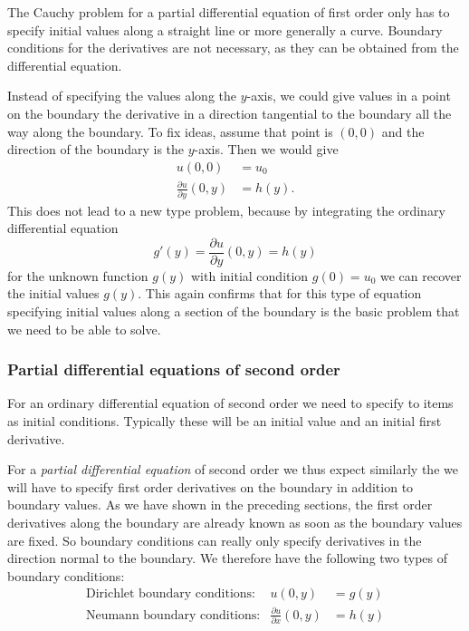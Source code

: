 The Cauchy problem for a partial differential equation of first order
only has to specify initial values along a straight line or more generally
a curve.
Boundary conditions for the derivatives are not necessary, as they can
be obtained from the differential equation.

Instead of specifying the values along the $y$-axis, we could give values
in a point on the boundary the derivative in a direction tangential to
the boundary all the way along the boundary.
To fix ideas, assume that point is $(0,0)$ and the direction of the
boundary is the $y$-axis.
Then we would give 
\begin{align*}
u(0,0)&=u_0\\
\frac{\partial u}{\partial y}(0,y)&=h(y).
\end{align*}
This does not lead to a new type problem, because by integrating
the ordinary differential equation
\[
g'(y)=\frac{\partial u}{\partial y}(0,y)=h(y)
\]
for the unknown function $g(y)$ with initial condition $g(0)=u_0$
we can recover the initial values $g(y)$.
This again confirms that for this type of equation specifying 
initial values along a section of the boundary is the basic problem
that we need to be able to solve.

\subsubsection{Partial differential equations of second order}
For an ordinary differential equation of second order we need to specify
to items as initial conditions.
Typically these will be an initial value and an initial first derivative.

For a {\em partial differential equation} of second order we thus expect 
similarly the we will have to specify first order derivatives on the
boundary in addition to boundary values.
As we have shown in the preceding sections, the first order derivatives
along the boundary are already known as soon as the boundary values are
fixed.
So boundary conditions can really only specify derivatives in the direction
normal to the boundary.
We therefore have the following two types of boundary conditions:
\begin{align}
&\text{Dirichlet boundary conditions:}&
u(0,y)&=g(y)&
\label{klassifikation:dirichlet-randbedingung}
\\
&\text{Neumann boundary conditions:}&
\frac{\partial u}{\partial x}(0,y)&=h(y)
\label{klassifikation:neumann-randbedingung}
\end{align}

